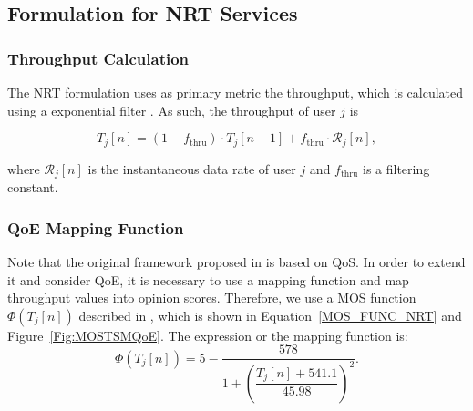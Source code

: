 \documentclass[conference]{IEEEtran}
\newcommand{\FigRef}[1]{Figure~\ref{#1}}
\newcommand{\EqRef}[1]{Equation~\ref{#1}}
\begin{document}
\subsection{Formulation for NRT Services}
\label{Sec:FormNRT}
%
\subsubsection{Throughput Calculation}
\label{Sec:THRU}
The \ac{NRT} formulation uses as primary metric the throughput, which is calculated using a exponential filter \cite{UFC40_WP2_TR_02_JSM}. As such, the throughput of user $j$ is

\begin{equation}
\label{Eq:ThroughputCalculation}
T_{j}\left[n\right] = \left(1 - f_{\mathrm{thru}}\right) \cdot T_{j}\left[n-1\right] + f_{\mathrm{thru}} \cdot \mathcal{R}_j[n],
\end{equation}

where $\mathcal{R}_j[n]$ is the instantaneous data rate of user $j$ and $f_{\mathrm{thru}}$ is a filtering constant.

\subsubsection{QoE Mapping Function}
Note that the original framework proposed in \cite{Rodrigues2014_Wiley} is based on \ac{QoS}. In order to extend it and consider \ac{QoE}, it is necessary to use a mapping function and map throughput values into opinion scores. Therefore, we use a \ac{MOS} function $\Phi(T_j [n])$ described in \cite{Poncela2014}, which is shown in \EqRef{MOS_FUNC_NRT} and \FigRef{Fig:MOSTSMQoE}. The expression or the mapping function is:
% 
\begin{equation}\label{MOS_FUNC_NRT}
\Phi\left(T_j[n]\right)= 5 - \frac{578}{1+\left(\dfrac{T_j[n] + 541.1}{45.98}\right)^{2}}.        
\end{equation}
\end{document}
